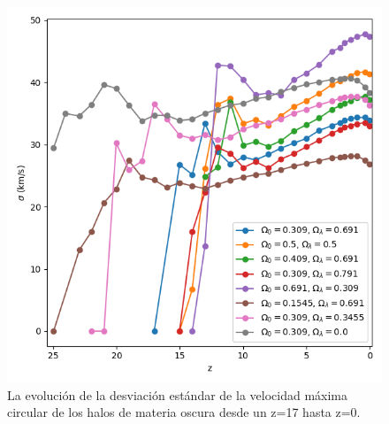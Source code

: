 \documentclass{beamer}
\begin{document}
\begin{frame}
\begin{columns}[t]
			\begin{column}{.5\textwidth}
				\begin{figure}
					\centering
					\includegraphics[scale=0.3]{Conc/VelMax_Std_Conc.png}
					\caption{\footnotesize La evolución de la desviación estándar de la velocidad máxima circular de los halos de materia oscura desde un z=17 hasta z=0.}
					\label{fig:Conc-VelMaxStd}
				\end{figure}
			\end{column}
		\end{columns}

	\end{frame}	

\end{document}
